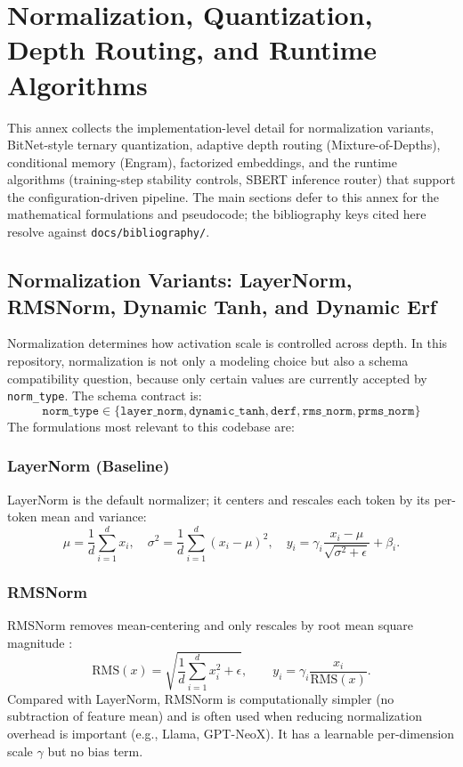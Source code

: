 \section{Normalization, Quantization, Depth Routing, and Runtime Algorithms}
\label{sec:annex-norm-bitnet-mod}

This annex collects the implementation-level detail for normalization variants, BitNet-style ternary quantization, adaptive depth routing (Mixture-of-Depths), conditional memory (Engram), factorized embeddings, and the runtime algorithms (training-step stability controls, SBERT inference router) that support the configuration-driven pipeline. The main sections defer to this annex for the mathematical formulations and pseudocode; the bibliography keys cited here resolve against \texttt{docs/bibliography/}.

\subsection{Normalization Variants: LayerNorm, RMSNorm, Dynamic Tanh, and Dynamic Erf}

Normalization determines how activation scale is controlled across depth. In this repository, normalization is not only a modeling choice but also a schema compatibility question, because only certain values are currently accepted by \texttt{norm\_type}. The schema contract is:
\[
\texttt{norm\_type} \in \{\texttt{layer\_norm}, \texttt{dynamic\_tanh}, \texttt{derf}, \texttt{rms\_norm}, \texttt{prms\_norm}\}
\]
The formulations most relevant to this codebase are:

\subsubsection{LayerNorm (Baseline)}
LayerNorm \citep{ba2016layer} is the default normalizer; it centers and rescales each token by its per-token mean and variance:
\[
\mu = \frac{1}{d}\sum_{i=1}^{d} x_i, \quad \sigma^2 = \frac{1}{d}\sum_{i=1}^{d}(x_i - \mu)^2, \quad y_i = \gamma_i \frac{x_i - \mu}{\sqrt{\sigma^2 + \epsilon}} + \beta_i.
\]

\subsubsection{RMSNorm}
RMSNorm removes mean-centering and only rescales by root mean square magnitude \citep{zhang_root_2019}:
\[
\mathrm{RMS}(x)=\sqrt{\frac{1}{d}\sum_{i=1}^{d}x_i^2+\epsilon},\qquad
y_i=\gamma_i\frac{x_i}{\mathrm{RMS}(x)}.
\]
Compared with LayerNorm, RMSNorm is computationally simpler (no subtraction of feature mean) and is often used when reducing normalization overhead is important (e.g., Llama, GPT-NeoX). It has a learnable per-dimension scale $\gamma$ but no bias term.

